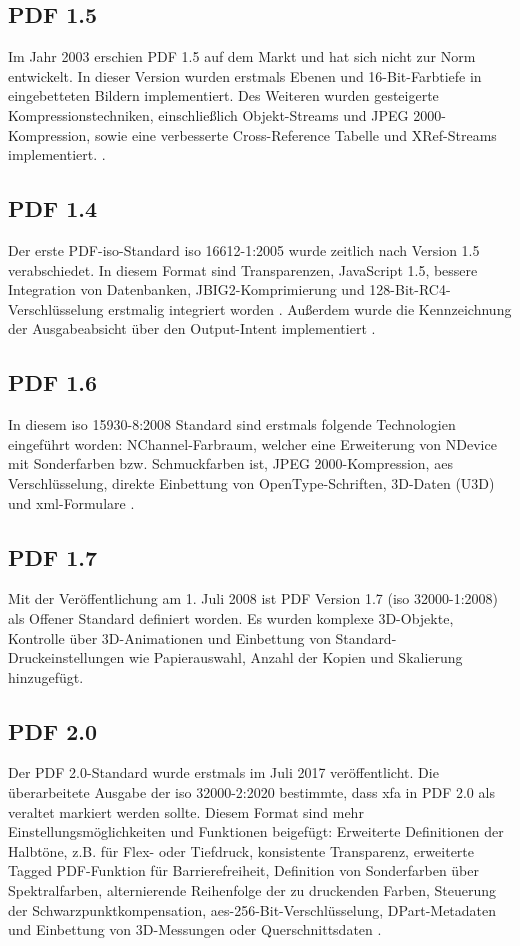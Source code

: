 \subsection{PDF 1.5}
Im Jahr 2003 erschien PDF 1.5 auf dem Markt und hat sich nicht zur Norm entwickelt. In dieser Version wurden erstmals Ebenen und 16-Bit-Farbtiefe in eingebetteten Bildern implementiert. Des Weiteren wurden gesteigerte Kompressionstechniken, einschließlich Objekt-Streams und JPEG 2000-Kompression, sowie eine verbesserte Cross-Reference Tabelle und XRef-Streams implementiert. \cite{proj-consult, schneeberger}. 

\subsection{PDF 1.4}
Der erste PDF-\gls{iso}-Standard \gls{iso} 16612-1:2005 wurde zeitlich nach Version 1.5 verabschiedet. In diesem Format sind Transparenzen, JavaScript 1.5, bessere Integration von Datenbanken, JBIG2-Komprimierung und 128-Bit-RC4-Verschlüsselung erstmalig integriert worden \cite{proj-consult}. Außerdem wurde die Kennzeichnung der Ausgabeabsicht über den Output-Intent implementiert \cite{schneeberger}.

\subsection{PDF 1.6}
In diesem \gls{iso} 15930-8:2008 Standard sind erstmals folgende Technologien eingeführt worden: NChannel-Farbraum, welcher eine Erweiterung von NDevice mit Sonderfarben bzw. Schmuckfarben ist, JPEG 2000-Kompression, \gls{aes} Verschlüsselung, direkte Einbettung von OpenType-Schriften, 3D-Daten (U3D) und \gls{xml}-Formulare \cite{proj-consult}.

\subsection{PDF 1.7}
Mit der Veröffentlichung am 1. Juli 2008 ist PDF Version 1.7 (\gls{iso} 32000-1:2008) als Offener Standard definiert worden. Es wurden komplexe 3D-Objekte, Kontrolle über 3D-Animationen und Einbettung von Standard-Druckeinstellungen wie Papierauswahl, Anzahl der Kopien und Skalierung hinzugefügt\cite{proj-consult}.

\subsection{PDF 2.0}
Der PDF 2.0-Standard wurde erstmals im Juli 2017 veröffentlicht. Die überarbeitete Ausgabe der \gls{iso} 32000-2:2020 bestimmte, dass \gls{xfa} in PDF 2.0 als veraltet markiert werden sollte. Diesem Format sind mehr Einstellungsmöglichkeiten und Funktionen beigefügt: Erweiterte Definitionen der Halbtöne, z.B. für Flex- oder Tiefdruck, konsistente Transparenz, erweiterte Tagged PDF-Funktion für Barrierefreiheit, Definition von Sonderfarben über Spektralfarben, alternierende Reihenfolge der zu druckenden Farben, Steuerung der Schwarzpunktkompensation, \gls{aes}-256-Bit-Verschlüsselung, DPart-Metadaten und Einbettung von 3D-Messungen oder Querschnittsdaten \cite{proj-consult}.